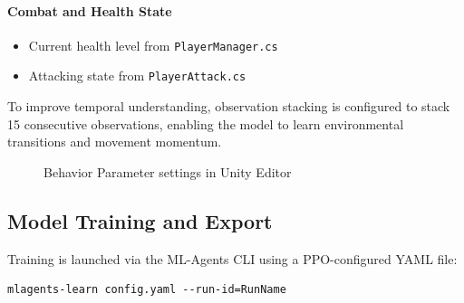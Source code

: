 \documentclass[12pt,oneside,openright,a4paper]{cpe-english-project}
\begin{document}
\paragraph{Combat and Health State}
\begin{itemize}
\item Current health level from \texttt{PlayerManager.cs}
\item Attacking state from \texttt{PlayerAttack.cs}
\end{itemize}

To improve temporal understanding, observation stacking is configured to stack 15 consecutive observations, enabling the model to learn environmental transitions and movement momentum.

\begin{figure}[H]
\centering
{}
\caption{Behavior Parameter settings in Unity Editor}\label{fig:BehaviorParameerInspector}
\end{figure}

\subsection{Model Training and Export}

Training is launched via the ML-Agents CLI using a PPO-configured YAML file:

\begin{lstlisting}
mlagents-learn config.yaml --run-id=RunName
\end{lstlisting}
\end{document}

